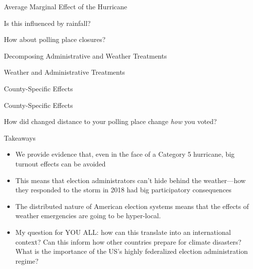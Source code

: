 \documentclass[
  ignorenonframetext,
  aspectratio=169]{beamer}
\providecommand{\tightlist}{%
  \setlength{\itemsep}{0pt}\setlength{\parskip}{0pt}}
\begin{document}
\begin{frame}{Average Marginal Effect of the Hurricane}
\protect\hypertarget{average-marginal-effect-of-the-hurricane}{}
\end{frame}

\begin{frame}{Is this influenced by rainfall?}
\protect\hypertarget{is-this-influenced-by-rainfall}{}
\end{frame}

\begin{frame}{How about polling place closures?}
\protect\hypertarget{how-about-polling-place-closures}{}
\end{frame}

\begin{frame}{Decomposing Administrative and Weather Treatments}
\protect\hypertarget{decomposing-administrative-and-weather-treatments}{}
\end{frame}

\begin{frame}{Weather and Administrative Treatments}
\protect\hypertarget{weather-and-administrative-treatments}{}
\end{frame}

\begin{frame}{County-Specific Effects}
\protect\hypertarget{county-specific-effects}{}
\end{frame}

\begin{frame}{County-Specific Effects}
\protect\hypertarget{county-specific-effects-1}{}
\end{frame}

\begin{frame}{How did changed distance to your polling place change
\emph{how} you voted?}
\protect\hypertarget{how-did-changed-distance-to-your-polling-place-change-how-you-voted}{}
\end{frame}

\begin{frame}{Takeaways}
\protect\hypertarget{takeaways}{}
\begin{itemize}[<+->]
\tightlist
\item
  We provide evidence that, even in the face of a Category 5 hurricane,
  big turnout effects can be avoided
\item
  This means that election administrators can't hide behind the
  weather---how they responded to the storm in 2018 had big
  participatory consequences
\item
  The distributed nature of American election systems means that the
  effects of weather emergencies are going to be hyper-local.
\item
  My question for YOU ALL: how can this translate into an international
  context? Can this inform how other countries prepare for climate
  disasters? What is the importance of the US's highly federalized
  election administration regime?
\end{itemize}
\end{frame}
\end{document}
